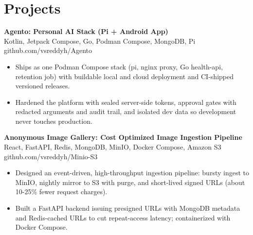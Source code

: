 \documentclass[a4paper,11pt]{article}
\newcommand{\resumeItem}[1]{\item \small{#1}}
\newcommand{\resumeSubheading}[4]{%
  \textbf{#1} \hfill \textbf{#2} \\
{#3} \hfill {#4}
}
\newcommand{\resumeSubHeadingListStart}{\begin{itemize}}
\newcommand{\resumeSubHeadingListEnd}{\end{itemize}}
\begin{document}
\section*{Projects}

\resumeSubheading
{Agento: Personal AI Stack (Pi + Android App)}{}{Kotlin, Jetpack Compose, Go, Podman Compose, MongoDB, Pi}{github.com/vsreddyh/Agento}
\resumeSubHeadingListStart
\resumeItem{Ships as one Podman Compose stack (pi, nginx proxy, Go health-api, retention job) with buildable local and cloud deployment and CI-shipped versioned releases.}
\resumeItem{Hardened the platform with sealed server-side tokens, approval gates with redacted arguments and audit trail, and isolated dev data so development never touches production.}
\resumeSubHeadingListEnd

\resumeSubheading
{Anonymous Image Gallery: Cost Optimized Image Ingestion Pipeline}{}{React, FastAPI, Redis, MongoDB, MinIO, Docker Compose, Amazon S3}{github.com/vsreddyh/Minio-S3}
\resumeSubHeadingListStart
\resumeItem{Designed an event-driven, high-throughput ingestion pipeline: bursty ingest to MinIO, nightly mirror to S3 with purge, and short-lived signed URLs (about 10-25\% fewer request charges).}
\resumeItem{Built a FastAPI backend issuing presigned URLs with MongoDB metadata and Redis-cached URLs to cut repeat-access latency; containerized with Docker Compose.}
\resumeSubHeadingListEnd

\vspace{-0.6em}
\end{document}
